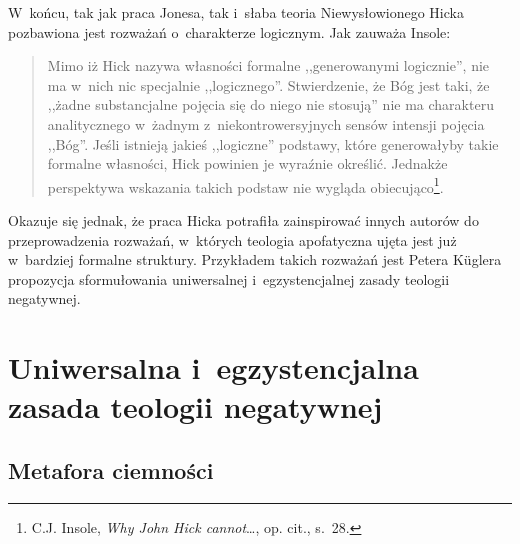 W~końcu, tak jak praca Jonesa, tak i~słaba teoria Niewysłowionego Hicka pozbawiona jest rozważań o~charakterze logicznym. Jak zauważa Insole:

\begin{quote}
Mimo iż Hick nazywa własności formalne ,,generowanymi logicznie'', nie ma w~nich nic specjalnie ,,logicznego''. Stwierdzenie, że Bóg jest taki, że ,,żadne substancjalne pojęcia się do niego nie stosują'' nie ma charakteru analitycznego w~żadnym z~niekontrowersyjnych sensów intensji pojęcia ,,Bóg''. Jeśli istnieją jakieś ,,logiczne'' podstawy, które generowałyby takie formalne własności, Hick powinien je wyraźnie określić. Jednakże perspektywa wskazania takich podstaw nie wygląda obiecująco\footnote{C.J. Insole, \textit{Why John Hick cannot}\ldots, op. cit., s.~28.}.
\end{quote}
Okazuje się jednak, że praca Hicka potrafiła zainspirować innych autorów do przeprowadzenia rozważań, w~których teologia apofatyczna ujęta jest już w~bardziej formalne struktury. Przykładem takich rozważań jest Petera Küglera propozycja sformułowania uniwersalnej i~egzystencjalnej zasady teologii negatywnej.









\chapter{Uniwersalna i~egzystencjalna zasada teologii negatywnej}\label{sil-kugler}


\section{Metafora ciemności}

